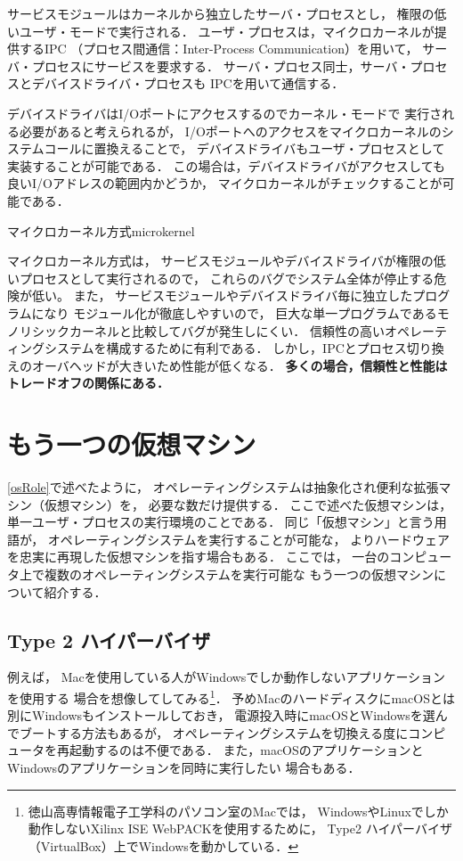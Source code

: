 サービスモジュールはカーネルから独立したサーバ・プロセスとし，
権限の低いユーザ・モードで実行される．
ユーザ・プロセスは，マイクロカーネルが提供するIPC
（プロセス間通信：Inter-Process Communication）を用いて，
サーバ・プロセスにサービスを要求する．
サーバ・プロセス同士，サーバ・プロセスとデバイスドライバ・プロセスも
IPCを用いて通信する．

デバイスドライバはI/Oポートにアクセスするのでカーネル・モードで
実行される必要があると考えられるが，
I/Oポートへのアクセスをマイクロカーネルのシステムコールに置換えることで，
デバイスドライバもユーザ・プロセスとして実装することが可能である．
この場合は，デバイスドライバがアクセスしても良いI/Oアドレスの範囲内かどうか，
マイクロカーネルがチェックすることが可能である．

{マイクロカーネル方式}{microkernel}

マイクロカーネル方式は，
サービスモジュールやデバイスドライバが権限の低いプロセスとして実行されるので，
これらのバグでシステム全体が停止する危険が低い。
また，
サービスモジュールやデバイスドライバ毎に独立したプログラムになり
モジュール化が徹底しやすいので，
巨大な単一プログラムであるモノリシックカーネルと比較してバグが発生しにくい．
信頼性の高いオペレーティングシステムを構成するために有利である．
しかし，IPCとプロセス切り換えのオーバヘッドが大きいため性能が低くなる．
{\bf 多くの場合，信頼性と性能はトレードオフの関係にある．}

\section{もう一つの仮想マシン}

\ref{osRole}で述べたように，
オペレーティングシステムは抽象化され便利な拡張マシン（仮想マシン）を，
必要な数だけ提供する．
ここで述べた仮想マシンは，単一ユーザ・プロセスの実行環境のことである．
同じ「仮想マシン」と言う用語が，
オペレーティングシステムを実行することが可能な，
よりハードウェアを忠実に再現した仮想マシンを指す場合もある．
ここでは，
一台のコンピュータ上で複数のオペレーティングシステムを実行可能な
もう一つの仮想マシンについて紹介する．

\subsection{Type 2 ハイパーバイザ}
例えば，
Macを使用している人がWindowsでしか動作しないアプリケーションを使用する
場合を想像してしてみる\footnote{
徳山高専情報電子工学科のパソコン室のMacでは，
WindowsやLinuxでしか動作しないXilinx ISE WebPACKを使用するために，
Type2 ハイパーバイザ（VirtualBox）上でWindowsを動かしている．}．
予めMacのハードディスクにmacOSとは別にWindowsもインストールしておき，
電源投入時にmacOSとWindowsを選んでブートする方法もあるが，
オペレーティングシステムを切換える度にコンピュータを再起動するのは不便である．
また，macOSのアプリケーションとWindowsのアプリケーションを同時に実行したい
場合もある．

